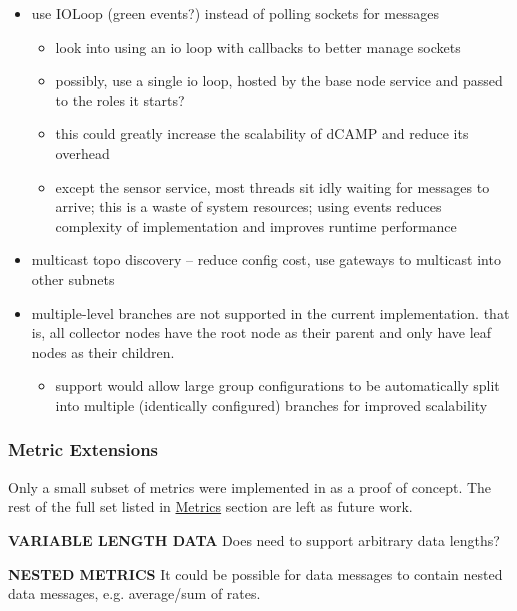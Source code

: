 \begin{itemize}

\item use IOLoop (green events?) instead of polling sockets for messages
      \begin{itemize}
      \item look into using an io loop with callbacks to better manage sockets
      \item possibly, use a single io loop, hosted by the base node service and passed to the roles it starts?
      \item this could greatly increase the scalability of dCAMP and reduce its overhead
      \item except the sensor service, most threads sit idly waiting for messages to arrive; this is a waste of system
            resources; using events reduces complexity of implementation and improves runtime performance
      \end{itemize}

\item multicast topo discovery -- reduce config cost, use gateways to multicast into other subnets

\item multiple-level branches are not supported in the current implementation. that is, all collector nodes have the
      root node as their parent and only have leaf nodes as their children.
      \begin{itemize}
      \item support would allow large group configurations to be automatically split into multiple (identically
            configured) branches for improved scalability
      \end{itemize}

\end{itemize}

\subsubsection{Metric Extensions}

Only a small subset of metrics were implemented in \dcamp as a proof of concept. The rest of the full set listed in
\hyperref[dcamp_metrics]{\dcamp Metrics} section are left as future work.

\textbf{VARIABLE LENGTH DATA}
Does \dcamp need to support arbitrary data lengths?

\textbf{NESTED METRICS}
It could be possible for data messages to contain nested data messages, e.g. average/sum of rates.

